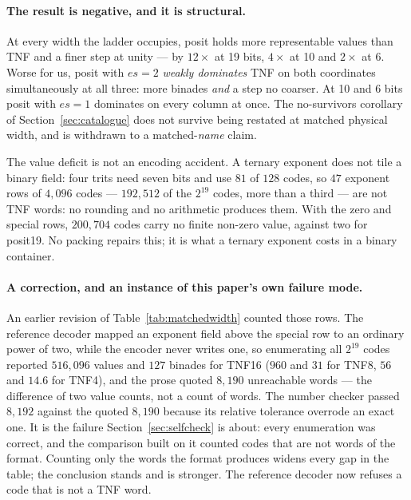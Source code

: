 \paragraph{The result is negative, and it is structural.} At every width the
ladder occupies, posit holds more representable values than TNF and a finer step
at unity --- by $12\times$ at 19 bits, $4\times$ at 10 and $2\times$ at 6. Worse
for us, posit with $es{=}2$ \emph{weakly dominates} TNF on both coordinates
simultaneously at all three: more binades \emph{and} a step no coarser. At 10 and
6 bits posit with $es{=}1$ dominates on every column at once. The
no-survivors corollary of Section~\ref{sec:catalogue} does not survive being
restated at matched physical width, and is withdrawn to a matched-\emph{name}
claim.

The value deficit is not an encoding accident. A ternary exponent does not tile
a binary field: four trits need seven bits and use $81$ of $128$ codes, so $47$
exponent rows of $4{,}096$ codes --- $192{,}512$ of the $2^{19}$ codes, more than a
third --- are not TNF words: no rounding and no arithmetic produces them. With the
zero and special rows, $200{,}704$ codes carry no finite non-zero value, against
two for posit19. No packing repairs this; it is what a ternary exponent costs in
a binary container.

\paragraph{A correction, and an instance of this paper's own failure mode.}
An earlier revision of Table~\ref{tab:matchedwidth} counted those rows. The
reference decoder mapped an exponent field above the special row to an ordinary
power of two, while the encoder never writes one, so enumerating all $2^{19}$
codes reported $516{,}096$ values and $127$ binades for TNF16 ($960$ and $31$
for TNF8, $56$ and $14.6$ for TNF4), and the prose quoted $8{,}190$ unreachable
words --- the difference of two value counts, not a count of words. The number
checker passed $8{,}192$ against the quoted $8{,}190$ because its relative
tolerance overrode an exact one. It is the failure Section~\ref{sec:selfcheck}
is about: every enumeration was correct, and the comparison built on it counted
codes that are not words of the format. Counting only the words the format
produces widens every gap in the table; the conclusion stands and is stronger.
The reference decoder now refuses a code that is not a TNF word.

